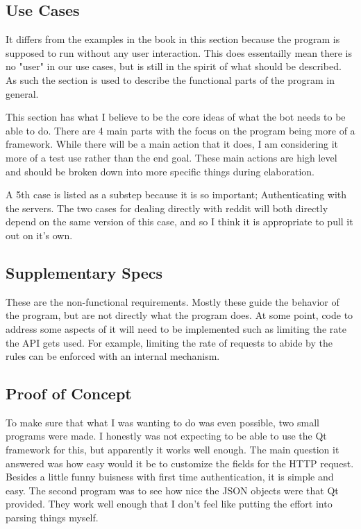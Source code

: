 \documentclass[12pt]{article}
\begin{document}
\subsection{Use Cases}

It differs from the examples in the book in this section because the program is supposed to run without any user interaction.
This does essentailly mean there is no "user" in our use cases, but is still in the spirit of what should be described.
As such the section is used to describe the functional parts of the program in general.

This section has what I believe to be the core ideas of what the bot needs to be able to do.
There are 4 main parts with the focus on the program being more of a framework.
While there will be a main action that it does, I am considering it more of a test use rather than the end goal.
These main actions are high level and should be broken down into more specific things during elaboration.

A 5th case is listed as a substep because it is so important; Authenticating with the servers.
The two cases for dealing directly with reddit will both directly depend on the same version of this case, and so I think it is appropriate to pull it out on it's own.

\subsection{Supplementary Specs}

These are the non-functional requirements.
Mostly these guide the behavior of the program, but are not directly what the program does.
At some point, code to address some aspects of it will need to be implemented such as limiting the rate the API gets used.
For example, limiting the rate of requests to abide by the rules can be enforced with an internal mechanism.

\subsection{Proof of Concept}

To make sure that what I was wanting to do was even possible, two small programs were made.
I honestly was not expecting to be able to use the Qt framework for this, but apparently it works well enough.
The main question it answered was how easy would it be to customize the fields for the HTTP request.
Besides a little funny buisness with first time authentication, it is simple and easy.
The second program was to see how nice the JSON objects were that Qt provided.
They work well enough that I don't feel like putting the effort into parsing things myself.
\end{document}
